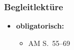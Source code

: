 %	
%
%
%
%
%	
%
%


\begin{frame}
	\frametitle{Begleitlektüre}
	
	\begin{itemize}
		\item \textbf{obligatorisch:}
			\begin{itemize}
				\item[] AM S.~55--69
			\end{itemize}
	\end{itemize}
\end{frame}

